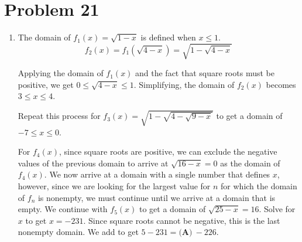 \documentclass{article}%
\begin{document}
%
\section*{Problem 21}%
\label{sec:Problem21}%
\begin{enumerate}%
\item%
The domain of $f_{1}(x)=\sqrt{1-x}$ is defined when $x\leq1$. 
\[f_{2}(x)=f_{1}\left(\sqrt{4-x}\right)=\sqrt{1-\sqrt{4-x}}\]

Applying the domain of $f_{1}(x)$ and the fact that square roots must be positive, we get $0\leq\sqrt{4-x}\leq1$. Simplifying, the domain of $f_{2}(x)$ becomes $3\leq x\leq4$. 

Repeat this process for $f_{3}(x)=\sqrt{1-\sqrt{4-\sqrt{9-x}}}$ to get a domain of $-7\leq x\leq0$.  

For $f_{4}(x)$, since square roots are positive, we can exclude the negative values of the previous domain to arrive at $\sqrt{16-x}=0$ as the domain of $f_{4}(x)$. We now arrive at a domain with a single number that defines $x$, however, since we are looking for the largest value for $n$ for which the domain of $f_{n}$ is nonempty, we must continue until we arrive at a domain that is empty. We continue with $f_{5}(x)$ to get a domain of $\sqrt{25-x}=16$. Solve for $x$ to get $x=-231$. Since square roots cannot be negative, this is the last nonempty domain. We add to get $5-231=\boxed{\textbf{(A)}\ -226}$.

%
\end{enumerate}

%
\end{document}
